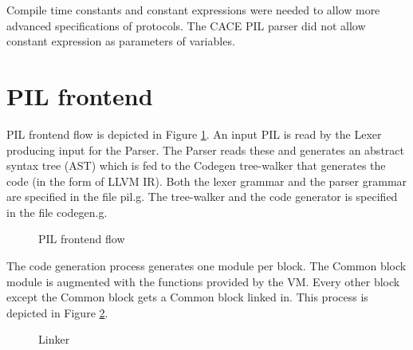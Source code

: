 Compile time constants and constant expressions were needed to allow
more advanced specifications of protocols. The CACE PIL parser did not
allow constant expression as parameters of variables.

\section{PIL frontend}

PIL frontend flow is depicted in Figure \ref{fig:parser_flow}.  An
input PIL is read by the Lexer producing input for the Parser. The
Parser reads these and generates an abstract syntax tree (AST) which
is fed to the Codegen tree-walker that generates the code (in the form
of LLVM IR). Both the lexer grammar and the parser grammar are
specified in the file pil.g. The tree-walker and the code generator is
specified in the file codegen.g.

\begin{figure}[hbt!]
  \centering
  \caption{PIL frontend flow}
  \label{fig:parser_flow}
\end{figure}

\filbreak

The code generation process generates one module per block. The Common
block module is augmented with the functions provided by the VM.
Every other block except the Common block gets a Common block linked
in. This process is depicted in Figure \ref{fig:linker}.

\begin{figure}[hbt!]
  \centering
  \caption{Linker}
  \label{fig:linker}
\end{figure}

